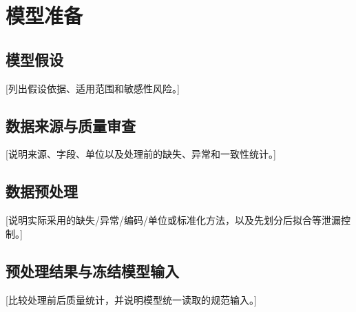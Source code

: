 \section{模型准备}
\subsection{模型假设}
[列出假设依据、适用范围和敏感性风险。]
\subsection{数据来源与质量审查}
[说明来源、字段、单位以及处理前的缺失、异常和一致性统计。]
\subsection{数据预处理}
[说明实际采用的缺失/异常/编码/单位或标准化方法，以及先划分后拟合等泄漏控制。]
\subsection{预处理结果与冻结模型输入}
[比较处理前后质量统计，并说明模型统一读取的规范输入。]
